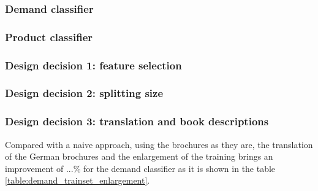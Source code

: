 \subsubsection{Demand classifier}
\label{ssub:demand_classifier}


\subsubsection{Product classifier}
\label{ssub:product_classifier}

\subsubsection{Design decision 1: feature selection}

\subsubsection{Design decision 2: splitting size}

\subsubsection{Design decision 3: translation and book descriptions}

Compared with a naive approach, using the brochures as they are, the translation of the German brochures and the enlargement of the training brings an improvement of ...\% for the demand classifier as it is shown in the table \ref{table:demand_trainset_enlargement}.

\endinput
\begin{itemize}
	\item Introduce our data set (show numbers, show examples)
	\item How we got our training data (everything at least twice, use the demands for learning, use the products for evaluation, Active Learning approach)
	\item Reference Precision/Recall from above again, final
	\item Evaluate of the training data generation, which approach is best (random, grouping)
\end{itemize}


